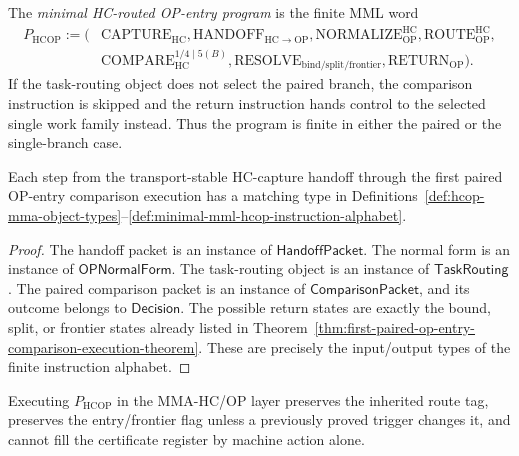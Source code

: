 \begin{definition}
\label{def:finite-hc-routed-op-entry-mml-program}
The \emph{minimal HC-routed OP-entry program} is the finite MML word
\[
\begin{aligned}
 P_{\mathrm{HCOP}}
 :=
 (&\mathrm{CAPTURE}_{\mathrm{HC}},
 \mathrm{HANDOFF}_{\mathrm{HC}\to\mathrm{OP}},
 \mathrm{NORMALIZE}_{\mathrm{OP}}^{\mathrm{HC}},
 \mathrm{ROUTE}_{\mathrm{OP}}^{\mathrm{HC}},\\
 &\mathrm{COMPARE}_{\mathrm{HC}}^{1/4\mid 5(B)},
 \mathrm{RESOLVE}_{\mathrm{bind/split/frontier}},
 \mathrm{RETURN}_{\mathrm{OP}}).
\end{aligned}
\]
If the task-routing object does not select the paired branch, the comparison instruction is skipped and the return instruction hands control to the selected single work family instead. Thus the program is finite in either the paired or the single-branch case.
\end{definition}

\begin{lemma}
\label{lem:typing-of-r01-r04-hc-routed-op-chain}
Each step from the transport-stable HC-capture handoff through the first paired OP-entry comparison execution has a matching type in Definitions~\ref{def:hcop-mma-object-types}--\ref{def:minimal-mml-hcop-instruction-alphabet}.
\end{lemma}

\begin{proof}
The handoff packet is an instance of \(\mathsf{HandoffPacket}\). The normal form is an instance of \(\mathsf{OPNormalForm}\). The task-routing object is an instance of \(\mathsf{TaskRouting}\). The paired comparison packet is an instance of \(\mathsf{ComparisonPacket}\), and its outcome belongs to \(\mathsf{Decision}\). The possible return states are exactly the bound, split, or frontier states already listed in Theorem~\ref{thm:first-paired-op-entry-comparison-execution-theorem}. These are precisely the input/output types of the finite instruction alphabet.
\end{proof}

\begin{lemma}
\label{lem:mml-mma-execution-preserves-route-and-frontier-discipline}
Executing \(P_{\mathrm{HCOP}}\) in the MMA-HC/OP layer preserves the inherited route tag, preserves the entry/frontier flag unless a previously proved trigger changes it, and cannot fill the certificate register by machine action alone.
\end{lemma}

